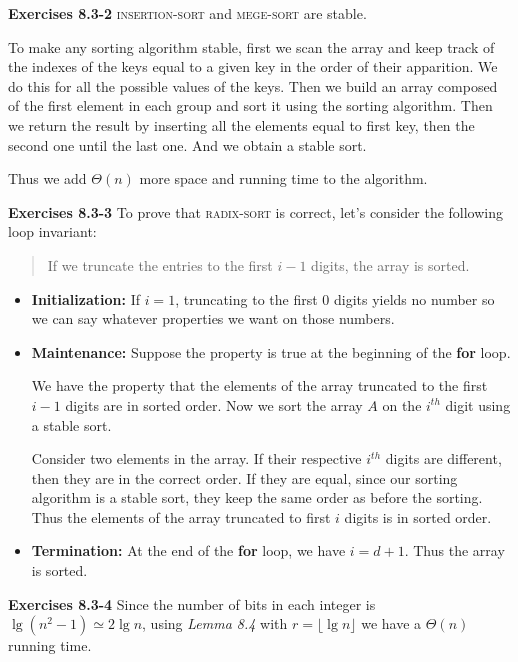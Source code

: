 \documentclass[a4paper,12pt]{article}
\newcommand{\newpar}[1]
{\bigskip \noindent \textbf{Exercises #1} \newline}
\begin{document}
\newpar{8.3-2} \textsc{insertion-sort} and \textsc{mege-sort} are
stable.

To make any sorting algorithm stable, first we scan the array and keep
track of the indexes of the keys equal to a given key in the
order of their apparition.  We do this for all the possible values of
the keys.  Then we build an array composed of the first element in
each group and sort it using the sorting algorithm.  Then we return
the result by inserting all the elements equal to first key, then the
second one until the last one.  And we obtain a stable sort.

Thus we add $\Theta(n)$ more space and running time to the algorithm.

\newpar{8.3-3} To prove that \textsc{radix-sort} is correct, let's
consider the following loop invariant:

\begin{quote}
  If we truncate the entries to the first $i-1$ digits, the array is
  sorted.
\end{quote}

\begin{itemize}
\item \textbf{Initialization: }  If $i=1$, truncating to the first $0$
  digits yields no number so we can say whatever properties we want on
  those numbers.

  \item \textbf{Maintenance: }  Suppose the property is true at the
    beginning of the \textbf{for} loop.

    We have the property that the elements of the array truncated to
    the first $i-1$ digits are in sorted order.  Now we sort the array
    $A$ on the $i^{th}$ digit using a stable sort.

    Consider two elements in the array.  If their respective $i^{th}$
    digits are different, then they are in the correct order.  If
    they are equal, since our sorting algorithm is a stable sort, they
    keep the same order as before the sorting.  Thus the elements of
    the array truncated to first $i$ digits is in sorted order.

    \item \textbf{Termination: } At the end of the \textbf{for} loop,
      we have $i = d+1$.  Thus the array is sorted.
\end{itemize}

\newpar{8.3-4}  Since the number of bits in each integer is
$\lg(n^2-1) \simeq 2 \lg n$, using \emph{Lemma 8.4} with $r = \lfloor
\lg n\rfloor$ we have a $\Theta(n)$ running time.
\end{document}
